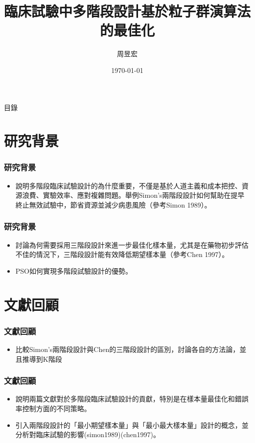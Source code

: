 \documentclass[xcolor=red]{beamer}
\title{臨床試驗中多階段設計基於粒子群演算法的最佳化}
\author{{周昱宏}}
\date{{\R \today}}
\begin{document}
\maketitle
\begin{frame}{目錄}
	\tableofcontents 
\end{frame}

\section{研究背景}
\begin{frame}
\frametitle{研究背景}
\begin{itemize}
\item 說明多階段臨床試驗設計的為什麼重要，不僅是基於人道主義和成本把控、資源浪費、實驗效率、應對複雜問題。舉例Simon's兩階段設計如何幫助在提早終止無效試驗中，節省資源並減少病患風險（參考Simon 1989）。
\end{itemize}
\end{frame}

\begin{frame}
\frametitle{研究背景}
\begin{itemize}
\item 討論為何需要採用三階段設計來進一步最佳化樣本量，尤其是在藥物初步評估不佳的情況下，三階段設計能有效降低期望樣本量（參考Chen 1997）。

\item PSO如何實現多階段試驗設計的優勢。
\end{itemize}
\end{frame}

\section{文獻回顧}
\begin{frame}
\frametitle{文獻回顧}
\begin{itemize}
\item 比較Simon's兩階段設計與Chen的三階段設計的區別，討論各自的方法論，並且推導到K階段
\end{itemize}
\end{frame}

\begin{frame}
\frametitle{文獻回顧}
\begin{itemize}
\item 說明兩篇文獻對於多階段臨床試驗設計的貢獻，特別是在樣本量最佳化和錯誤率控制方面的不同策略。
\item 引入兩階段設計的「最小期望樣本量」與「最小最大樣本量」設計的概念，並分析對臨床試驗的影響​(simon1989)​(chen1997)。
\end{itemize}
\end{frame}
\end{document}
